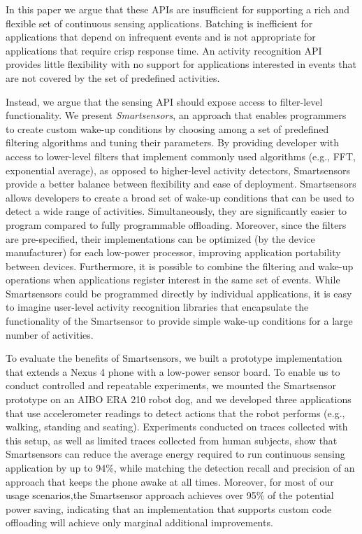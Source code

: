 In this paper we argue that these APIs are insufficient for supporting
a rich and flexible set of continuous sensing applications.
Batching is inefficient for applications that depend on infrequent
events and is not appropriate for applications that require crisp
response time.  An activity recognition API provides little
flexibility with no support for applications interested in events that
are not covered by the set of predefined activities.  

Instead, we argue that the sensing API should expose access to
filter-level functionality.  We present {\em Smartsensors}, an
approach that enables programmers to create custom wake-up conditions
by choosing among a set of predefined filtering algorithms and tuning
their parameters.  By providing developer with access to lower-level
filters that implement commonly used algorithms (e.g., FFT,
exponential average), as opposed to higher-level activity detectors,
Smartsensors provide a better balance between flexibility and ease of
deployment.  Smartsensors allows developers to create a broad set of
wake-up conditions that can be used to detect a wide range of
activities.  Simultaneously, they are significantly easier to program
compared to fully programmable offloading.  Moreover, since the
filters are pre-specified, their implementations can be optimized (by
the device manufacturer) for each low-power processor, improving
application portability between devices.  Furthermore, it is possible
to combine the filtering and wake-up operations when applications
register interest in the same set of events.  While Smartsensors could
be programmed directly by individual applications, it is easy to
imagine user-level activity recognition libraries that encapsulate the
functionality of the Smartsensor to provide simple wake-up conditions
for a large number of activities.

To evaluate the benefits of Smartsensors, we built a prototype
implementation that extends a Nexus 4 phone with a low-power sensor
board.  To enable us to conduct controlled and repeatable experiments,
we mounted the Smartsensor prototype on an AIBO ERA 210 robot dog, and
we developed three applications that use accelerometer readings to
detect actions that the robot performs (e.g., walking, standing and
seating).  Experiments conducted on traces collected with this setup,
as well as limited traces collected from human subjects, show that
Smartsensors can reduce the average energy required to run continuous
sensing application by up to 94\%, while matching the detection recall
and precision of an approach that keeps the phone awake at all times.
Moreover, for most of our usage scenarios,the Smartsensor approach
achieves over 95\% of the potential power saving, indicating that an
implementation that supports custom code offloading will
achieve only marginal additional improvements.

